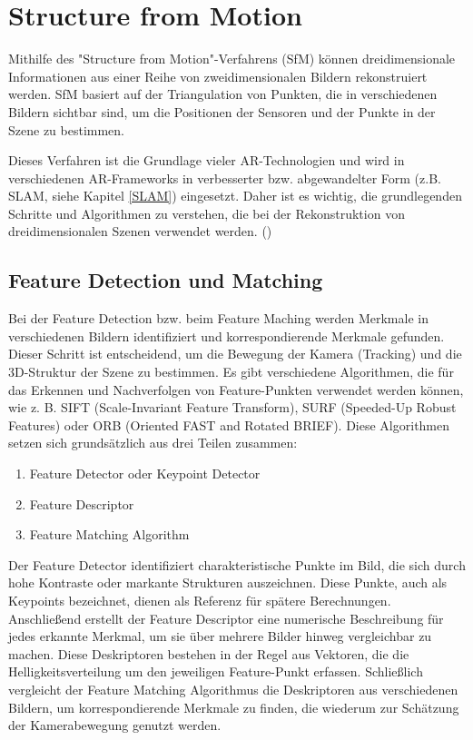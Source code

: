 \section{Structure from Motion}\label{SfM}

Mithilfe des "Structure from Motion"-Verfahrens (SfM) können dreidimensionale Informationen aus einer Reihe von zweidimensionalen Bildern rekonstruiert werden. SfM basiert auf der Triangulation von Punkten, die in verschiedenen Bildern sichtbar sind, um die Positionen der Sensoren und der Punkte in der Szene zu bestimmen. 

Dieses Verfahren ist die Grundlage vieler AR-Technologien und wird in verschiedenen AR-Frameworks in verbesserter bzw. abgewandelter Form (z.B. SLAM, siehe Kapitel \ref{SLAM}) eingesetzt. Daher ist es wichtig, die grundlegenden Schritte und Algorithmen zu verstehen, die bei der Rekonstruktion von dreidimensionalen Szenen verwendet werden. (\cite{doerner2022virtual})

\subsection{Feature Detection und Matching}

Bei der Feature Detection bzw. beim Feature Maching werden Merkmale in verschiedenen Bildern identifiziert und korrespondierende Merkmale gefunden. Dieser Schritt ist entscheidend, um die Bewegung der Kamera (Tracking) und die 3D-Struktur der Szene zu bestimmen. Es gibt verschiedene Algorithmen, die für das Erkennen und Nachverfolgen von Feature-Punkten verwendet werden können, wie z. B. SIFT (Scale-Invariant Feature Transform), SURF (Speeded-Up Robust Features) oder ORB (Oriented FAST and Rotated BRIEF). Diese Algorithmen setzen sich grundsätzlich aus drei Teilen zusammen:

\begin{enumerate}
    \item Feature Detector oder Keypoint Detector
    \item Feature Descriptor
    \item Feature Matching Algorithm
\end{enumerate}

Der Feature Detector identifiziert charakteristische Punkte im Bild, die sich durch hohe Kontraste oder markante Strukturen auszeichnen. Diese Punkte, auch als Keypoints bezeichnet, dienen als Referenz für spätere Berechnungen. Anschließend erstellt der Feature Descriptor eine numerische Beschreibung für jedes erkannte Merkmal, um sie über mehrere Bilder hinweg vergleichbar zu machen. Diese Deskriptoren bestehen in der Regel aus Vektoren, die die Helligkeitsverteilung um den jeweiligen Feature-Punkt erfassen. Schließlich vergleicht der Feature Matching Algorithmus die Deskriptoren aus verschiedenen Bildern, um korrespondierende Merkmale zu finden, die wiederum zur Schätzung der Kamerabewegung genutzt werden.

